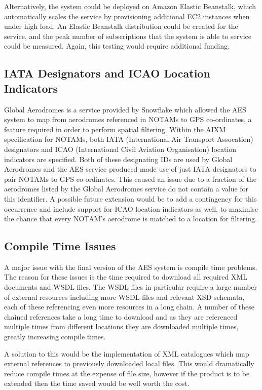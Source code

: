 \documentclass[a4paper, 12pt, twoside]{article}
\begin{document}
Alternatively, the system could be deployed on Amazon Elastic Beanstalk, which automatically scales the service by provisioning additional EC2 instances when under high load. An Elastic Beanstalk distribution could be created for the service, and the peak number of subscriptions that the system is able to service could be measured. Again, this testing would require additional funding.

\subsection{IATA Designators and ICAO Location Indicators}
\label{sec:future_designators}

Global Aerodromes is a service provided by Snowflake which allowed the AES system to map from aerodromes referenced in NOTAMs to GPS co-ordinates, a feature required in order to perform spatial filtering. Within the AIXM specification for NOTAMs, both IATA (International Air Transport Assocation) designators and ICAO (International Civil Aviation Organisation) location indicators are specified. Both of these designating IDs are used by Global Aerodromes and the AES service produced made use of just IATA designators to pair NOTAMs to GPS co-ordinates. This caused an issue due to a fraction of the aerodromes listed by the Global Aerodromes service do not contain a value for this identifier. A possible future extension would be to add a contingency for this occurrence and include support for ICAO location indicators as well, to maximise the chance that every NOTAM's aerodrome is matched to a location for filtering.

\subsection{Compile Time Issues}
\label{sec:future_compilation}

A major issue with the final version of the AES system is compile time problems. The reason for these issues is the time required to download all required XML documents and WSDL files. The WSDL files in particular require a large number of external resources including more WSDL files and relevant XSD schemata, each of these referencing even more resources in a long chain. A number of these chained references take a long time to download and as they are referenced multiple times from different locations they are downloaded multiple times, greatly increasing compile times.

A solution to this would be the implementation of XML catalogues which map external references to previously downloaded local files. This would dramatically reduce compile times at the expense of file size, however if the product is to be extended then the time saved would be well worth the cost.
\end{document}
